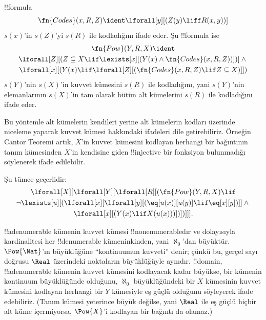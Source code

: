 \documentclass[../../../include/open-logic-section]{subfiles}
\begin{document}
\begin{prop}
!!{formula}
  \[
  \fn{Codes}(x, R, Z) \ident \lforall[y][(Z(y) \liff
    R(x, y))]
  \]
$s(x)$'in $s(Z)$'yi $s(R)$ ile kodladığını ifade eder. Şu
!!{formula} ise
\begin{multline*}
  \fn{Pow}(Y, R, X) \ident \\
  \lforall[Z][(Z \subseteq X \lif \lexists[x][(Y(x) \land
    \fn{Codes}(x, R, Z))])] \land {} \\ \lforall[x][(Y(x) \lif
  \lforall[Z][(\fn{Codes}(x, R, Z) \lif Z \subseteq X)]])
\end{multline*}
$s(Y)$'nin $s(X)$'in kuvvet kümesini $s(R)$ ile kodladığını, yani $s(Y)$'nin
elemanlarının $s(X)$'in tam olarak bütün alt kümelerini $s(R)$ ile
kodladığını ifade eder.
\end{prop}

\begin{explain}
Bu yöntemle alt kümelerin kendileri yerine alt kümelerin kodları üzerinde
niceleme yaparak kuvvet kümesi hakkındaki ifadeleri dile getirebiliriz.
Örneğin Cantor Teoremi artık, $X$'in kuvvet kümesini kodlayan herhangi bir
bağıntının tanım kümesinden $X$'in kendisine giden !!{injective} bir fonksiyon
bulunmadığı söylenerek ifade edilebilir.
\end{explain}

\begin{prop}
Şu tümce geçerlidir:
\begin{multline*}
  \lforall[X][\lforall[Y][\lforall[R][(\fn{Pow}(Y, R, X) \lif \\
      \lnot \lexists[u][(\lforall[x][\lforall[y][(\eq[u(x)][u(y)] \lif
            \eq[x][y])]] \land {}\\
        \lforall[x][(Y(x) \lif X(u(x)))])])]]].
\end{multline*}
\end{prop}

\begin{explain}
!!a{denumerable} kümenin kuvvet kümesi !!{nonenumerable}{}dır ve dolayısıyla
kardinalitesi her !!{denumerable} kümeninkinden, yani $\aleph_0$'dan
büyüktür. $\Pow{\Nat}$'ın büyüklüğüne ``kontinuumun kuvveti'' denir; çünkü
bu, gerçel sayı doğrusu $\Real$ üzerindeki noktaların büyüklüğüyle aynıdır.
!!{domain}, !!a{denumerable} kümenin kuvvet kümesini kodlayacak kadar
büyükse, bir kümenin kontinuum büyüklüğünde olduğunu, $\aleph_0$
büyüklüğündeki bir $X$ kümesinin kuvvet kümesini kodlayan herhangi bir $Y$
kümesiyle eş güçlü olduğunu söyleyerek ifade edebiliriz. (Tanım kümesi yeterince
büyük değilse, yani $\Real$ ile eş güçlü hiçbir alt küme içermiyorsa,
$\Pow{X}$'i kodlayan bir bağıntı da olamaz.)
\end{explain}
\end{document}
